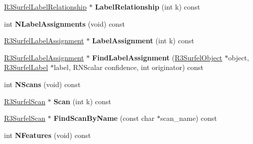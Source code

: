 \begin{DoxyCompactItemize}
\item 
\hyperlink{class_r3_surfel_label_relationship}{R3\+Surfel\+Label\+Relationship} $\ast$ {\bfseries Label\+Relationship} (int k) const \hypertarget{class_r3_surfel_scene_abe517227057122990ce0f5d1d3d9fc43}{}\label{class_r3_surfel_scene_abe517227057122990ce0f5d1d3d9fc43}

\item 
int {\bfseries N\+Label\+Assignments} (void) const \hypertarget{class_r3_surfel_scene_aaff3a67de215e280c8bf1942ba714447}{}\label{class_r3_surfel_scene_aaff3a67de215e280c8bf1942ba714447}

\item 
\hyperlink{class_r3_surfel_label_assignment}{R3\+Surfel\+Label\+Assignment} $\ast$ {\bfseries Label\+Assignment} (int k) const \hypertarget{class_r3_surfel_scene_aa428129f83c1d499154aa751de035a7a}{}\label{class_r3_surfel_scene_aa428129f83c1d499154aa751de035a7a}

\item 
\hyperlink{class_r3_surfel_label_assignment}{R3\+Surfel\+Label\+Assignment} $\ast$ {\bfseries Find\+Label\+Assignment} (\hyperlink{class_r3_surfel_object}{R3\+Surfel\+Object} $\ast$object, \hyperlink{class_r3_surfel_label}{R3\+Surfel\+Label} $\ast$label, R\+N\+Scalar confidence, int originator) const \hypertarget{class_r3_surfel_scene_ab2f00b2ce4c676dce0f02a51f56ba83e}{}\label{class_r3_surfel_scene_ab2f00b2ce4c676dce0f02a51f56ba83e}

\item 
int {\bfseries N\+Scans} (void) const \hypertarget{class_r3_surfel_scene_ab9bd6ca17f3f64f94c722307781029fe}{}\label{class_r3_surfel_scene_ab9bd6ca17f3f64f94c722307781029fe}

\item 
\hyperlink{class_r3_surfel_scan}{R3\+Surfel\+Scan} $\ast$ {\bfseries Scan} (int k) const \hypertarget{class_r3_surfel_scene_a318c042f99619aaea18fd1d422ba1dac}{}\label{class_r3_surfel_scene_a318c042f99619aaea18fd1d422ba1dac}

\item 
\hyperlink{class_r3_surfel_scan}{R3\+Surfel\+Scan} $\ast$ {\bfseries Find\+Scan\+By\+Name} (const char $\ast$scan\+\_\+name) const \hypertarget{class_r3_surfel_scene_ae00d75c742b1ff423b5205c75c206681}{}\label{class_r3_surfel_scene_ae00d75c742b1ff423b5205c75c206681}

\item 
int {\bfseries N\+Features} (void) const \hypertarget{class_r3_surfel_scene_a974946cd84eefd3b93487104b89806a7}{}\label{class_r3_surfel_scene_a974946cd84eefd3b93487104b89806a7}


\end{DoxyCompactItemize}

